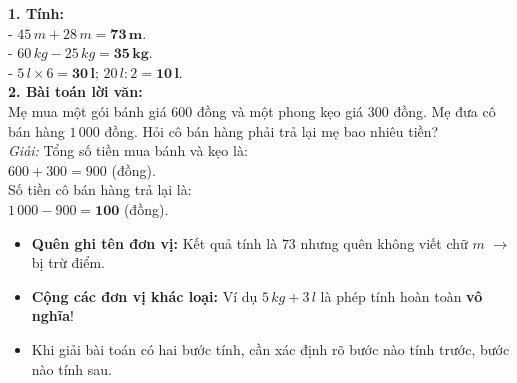 \documentclass[10pt,a4paper]{article}
\begin{document}
\vspace{-1.5mm}
\noindent
\begin{minipage}[t]{0.49\textwidth}\vspace{0pt}
\begin{tcolorbox}[
  enhanced,
  colback=green!4!white,
  colframe=green!60!black,
  arc=2mm, boxrule=0.8pt,
  left=2mm, right=2mm, top=1.8mm, bottom=1.8mm,
  title={\footnotesize\bfseries\color{white}\faCheckCircle\ 4. Bài tập thực hành tổng hợp}
]
{\footnotesize
\textbf{1. Tính:}\\
- $45\,m + 28\,m = \mathbf{73\,m}$.\\
- $60\,kg - 25\,kg = \mathbf{35\,kg}$.\\
- $5\,l \times 6 = \mathbf{30\,l}$; \quad $20\,l : 2 = \mathbf{10\,l}$.\\
\textbf{2. Bài toán lời văn:}\\
Mẹ mua một gói bánh giá $600$ đồng và một phong kẹo giá $300$ đồng. Mẹ đưa cô bán hàng $1\,000$ đồng. Hỏi cô bán hàng phải trả lại mẹ bao nhiêu tiền?\\
\textit{Giải:} Tổng số tiền mua bánh và kẹo là:\\
$600 + 300 = 900$ (đồng).\\
Số tiền cô bán hàng trả lại là:\\
$1\,000 - 900 = \mathbf{100}$ (đồng).
}
\end{tcolorbox}
\end{minipage}
\hfill
\begin{minipage}[t]{0.49\textwidth}\vspace{0pt}
\begin{tcolorbox}[
  enhanced,
  colback=rose!4!white,
  colframe=rose!70!black,
  arc=2mm, boxrule=0.8pt,
  left=2mm, right=2mm, top=1.8mm, bottom=1.8mm,
  title={\footnotesize\bfseries\color{white}\faExclamationTriangle\ 5. Lỗi học sinh hay quên}
]
{\footnotesize
\begin{itemize}\setlength{\itemsep}{1.5pt}\setlength{\leftskip}{-2.5mm}
  \item \textbf{Quên ghi tên đơn vị:} Kết quả tính là $73$ nhưng quên không viết chữ $m$ $\to$ bị trừ điểm.
  \item \textbf{Cộng các đơn vị khác loại:} Ví dụ $5\,kg + 3\,l$ là phép tính hoàn toàn \textbf{vô nghĩa}!
  \item Khi giải bài toán có hai bước tính, cần xác định rõ bước nào tính trước, bước nào tính sau.
\end{itemize}
}
\end{tcolorbox}
\end{minipage}
\end{document}
